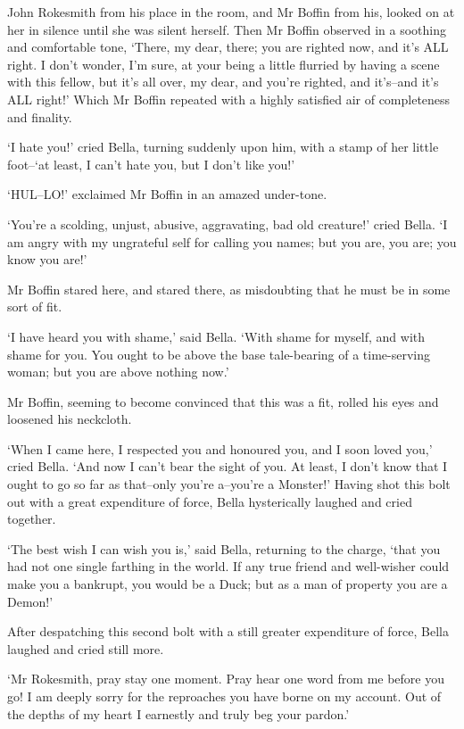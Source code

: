 John Rokesmith from his place in the room, and Mr Boffin from his,
looked on at her in silence until she was silent herself. Then Mr Boffin
observed in a soothing and comfortable tone, ‘There, my dear, there; you
are righted now, and it’s ALL right. I don’t wonder, I’m sure, at your
being a little flurried by having a scene with this fellow, but it’s all
over, my dear, and you’re righted, and it’s--and it’s ALL right!’ Which
Mr Boffin repeated with a highly satisfied air of completeness and
finality.

‘I hate you!’ cried Bella, turning suddenly upon him, with a stamp of
her little foot--‘at least, I can’t hate you, but I don’t like you!’

‘HUL--LO!’ exclaimed Mr Boffin in an amazed under-tone.

‘You’re a scolding, unjust, abusive, aggravating, bad old creature!’
cried Bella. ‘I am angry with my ungrateful self for calling you names;
but you are, you are; you know you are!’

Mr Boffin stared here, and stared there, as misdoubting that he must be
in some sort of fit.

‘I have heard you with shame,’ said Bella. ‘With shame for myself, and
with shame for you. You ought to be above the base tale-bearing of a
time-serving woman; but you are above nothing now.’

Mr Boffin, seeming to become convinced that this was a fit, rolled his
eyes and loosened his neckcloth.

‘When I came here, I respected you and honoured you, and I soon loved
you,’ cried Bella. ‘And now I can’t bear the sight of you. At least, I
don’t know that I ought to go so far as that--only you’re a--you’re a
Monster!’ Having shot this bolt out with a great expenditure of force,
Bella hysterically laughed and cried together.

‘The best wish I can wish you is,’ said Bella, returning to the charge,
‘that you had not one single farthing in the world. If any true friend
and well-wisher could make you a bankrupt, you would be a Duck; but as a
man of property you are a Demon!’

After despatching this second bolt with a still greater expenditure of
force, Bella laughed and cried still more.

‘Mr Rokesmith, pray stay one moment. Pray hear one word from me before
you go! I am deeply sorry for the reproaches you have borne on my
account. Out of the depths of my heart I earnestly and truly beg your
pardon.’

